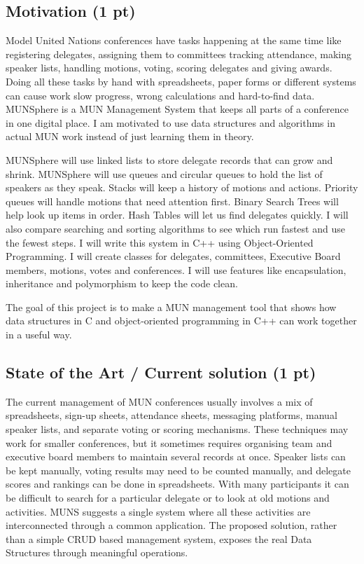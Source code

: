 \documentclass[11pt,a4paper]{article}
\begin{document}
\subsection*{Motivation (1 pt)}
Model United Nations conferences have tasks happening at the same time like registering delegates,
assigning them to committees tracking attendance, making speaker lists, handling motions, voting,
scoring delegates and giving awards. Doing all these tasks by hand with spreadsheets, paper forms
or different systems can cause work slow progress, wrong calculations and hard-to-find data.
MUNSphere is a MUN Management System that keeps all parts of a conference in one digital
place. I am motivated to use data structures and algorithms in actual MUN work instead of just
learning them in theory.

MUNSphere will use linked lists to store delegate records that can grow and shrink. MUNSphere
will use queues and circular queues to hold the list of speakers as they speak. Stacks will keep a
history of motions and actions. Priority queues will handle motions that need attention first.
Binary Search Trees will help look up items in order. Hash Tables will let us find delegates quickly.
I will also compare searching and sorting algorithms to see which run fastest and use the fewest
steps. I will write this system in C++ using Object-Oriented Programming. I will create classes for
delegates, committees, Executive Board members, motions, votes and conferences. I will use
features like encapsulation, inheritance and polymorphism to keep the code clean.

The goal of this project is to make a MUN management tool that shows how data structures in C
and object-oriented programming in C++ can work together in a useful way.

\subsection*{State of the Art / Current solution (1 pt)}
The current management of MUN conferences usually involves a mix of spreadsheets, sign-up sheets,
attendance sheets, messaging platforms, manual speaker lists, and separate voting or scoring mechanisms.
These techniques may work for smaller conferences, but it sometimes requires organising team and
executive board members to maintain several records at once. Speaker lists can be kept manually,
voting results may need to be counted manually, and delegate scores and rankings can be done in
spreadsheets. With many participants it can be difficult to search for a particular delegate or to look
at old motions and activities. MUNS suggests a single system where all these activities are interconnected
through a common application. The proposed solution, rather than a simple CRUD based management
system, exposes the real Data Structures through meaningful operations.
\end{document}
